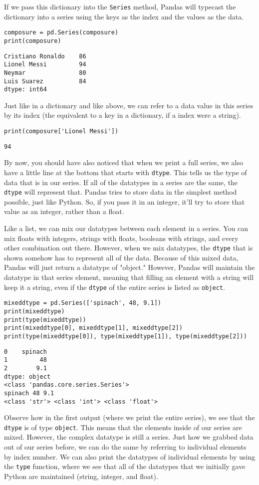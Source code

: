 If we pass this dictionary into the \verb|Series| method, Pandas will typecast the dictionary into a series using the keys as the index and the values as the data.
\begin{lstlisting}[style=pippython]
composure = pd.Series(composure)
print(composure)
\end{lstlisting}
\begin{lstlisting}
Cristiano Ronaldo    86
Lionel Messi         94
Neymar               80
Luis Suarez          84
dtype: int64
\end{lstlisting}
Just like in a dictionary and like above, we can refer to a data value in this series by its index (the equivalent to a key in a dictionary, if a index were a string).
\begin{lstlisting}[style=pippython]
print(composure['Lionel Messi'])
\end{lstlisting}
\begin{lstlisting}
94
\end{lstlisting}
By now, you should have also noticed that when we print a full series, we also have a little line at the bottom that starts with \verb|dtype|. This tells us the type of data that is in our series. If all of the datatypes in a series are the same, the \verb|dtype| will represent that. Pandas tries to store data in the simplest method possible, just like Python. So, if you pass it in an integer, it'll try to store that value as an integer, rather than a float.\par
Like a list, we can mix our datatypes between each element in a series. You can mix floats with integers, strings with floats, booleans with strings, and every other combination out there. However, when we mix datatypes, the \verb|dtype| that is shown somehow has to represent all of the data. Because of this mixed data, Pandas will just return a datatype of "object." However, Pandas will maintain the datatype in that series element, meaning that filling an element with a string will keep it a string, even if the \verb|dtype| of the entire series is listed as \verb|object|.
\begin{lstlisting}[style=pippython]
mixeddtype = pd.Series(['spinach', 48, 9.1])
print(mixeddtype)
print(type(mixeddtype))
print(mixeddtype[0], mixeddtype[1], mixeddtype[2])
print(type(mixeddtype[0]), type(mixeddtype[1]), type(mixeddtype[2]))
\end{lstlisting}
\begin{lstlisting}
0    spinach
1         48
2        9.1
dtype: object
<class 'pandas.core.series.Series'>
spinach 48 9.1
<class 'str'> <class 'int'> <class 'float'>
\end{lstlisting}
Observe how in the first output (where we print the entire series), we see that the \verb|dtype| is of type \verb|object|. This means that the elements inside of our series are mixed. However, the complex datatype is still a series. Just how we grabbed data out of our series before, we can do the same by referring to individual elements by index number. We can also print the datatypes of individual elements by using the \verb|type| function, where we see that all of the datatypes that we initially gave Python are maintained (string, integer, and float). 

